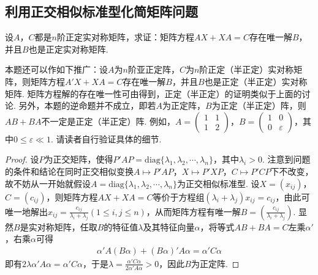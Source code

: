 \documentclass[../../main.tex]{subfiles}
\begin{document}
\subsection{利用正交相似标准型化简矩阵问题}

\begin{proposition}\label{proposition:例9.69}
设\(A\)，\(C\)都是\(n\)阶正定实对称矩阵，求证：矩阵方程\(AX + XA = C\)存在唯一解\(B\)，并且\(B\)也是正定实对称矩阵.
\end{proposition}
\begin{remark}
本题还可以作如下推广：设\(A\)为\(n\)阶亚正定阵，\(C\)为\(n\)阶正定（半正定）实对称矩阵，则矩阵方程\(A'X + XA = C\)存在唯一解\(B\)，并且\(B\)也是正定（半正定）实对称矩阵. 矩阵方程解的存在唯一性可由得到，正定（半正定）的证明类似于上面的讨论. 另外，本题的逆命题并不成立，即若\(A\)为正定阵，\(B\)为正定（半正定）阵，则\(AB + BA\)不一定是正定（半正定）阵. 例如，\(A=\begin{pmatrix}1&1\\1&2\end{pmatrix}\)，\(B=\begin{pmatrix}1&0\\0&\varepsilon\end{pmatrix}\)，其中\(0\leqslant \varepsilon\ll1\). 请读者自行验证具体的细节.
\end{remark}
\begin{proof}
设\(P\)为正交矩阵，使得\(P'AP=\mathrm{diag}\{\lambda_1,\lambda_2,\cdots,\lambda_n\}\)，其中\(\lambda_i > 0\). 注意到问题的条件和结论在同时正交相似变换\(A\mapsto P'AP\)，\(X\mapsto P'XP\)，\(C\mapsto P'CP\)下不改变，故不妨从一开始就假设\(A = \mathrm{diag}\{\lambda_1,\lambda_2,\cdots,\lambda_n\}\)为正交相似标准型. 设\(X=(x_{ij})\)，\(C=(c_{ij})\)，则矩阵方程\(AX + XA = C\)等价于方程组\((\lambda_i + \lambda_j)x_{ij}=c_{ij}\)，由此可唯一地解出\(x_{ij}=\frac{c_{ij}}{\lambda_i + \lambda_j}(1\leqslant  i,j\leqslant  n)\)，从而矩阵方程有唯一解\(B = (\frac{c_{ij}}{\lambda_i + \lambda_j})\). 显然\(B\)是实对称矩阵，任取\(B\)的特征值\(\lambda\)及其特征向量\(\alpha\)，将等式\(AB + BA = C\)左乘\(\alpha'\)，右乘\(\alpha\)可得
\begin{align*}
\alpha'A(B\alpha)+(B\alpha)'A\alpha=\alpha'C\alpha
\end{align*}
即有\(2\lambda\alpha'A\alpha=\alpha'C\alpha\)，于是\(\lambda=\frac{\alpha'C\alpha}{2\alpha'A\alpha}>0\)，因此\(B\)为正定阵.
\end{proof}
\end{document}
